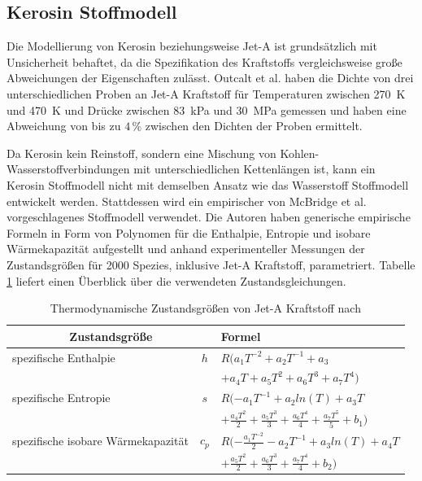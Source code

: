 \subsection{Kerosin Stoffmodell}

Die Modellierung von Kerosin beziehungsweise Jet-A ist grundsätzlich mit Unsicherheit behaftet, da die Spezifikation des Kraftstoffs vergleichsweise große Abweichungen der Eigenschaften zulässt. Outcalt et al. \cite{Outcalt.2009} haben die Dichte von drei unterschiedlichen Proben an Jet-A Kraftstoff für Temperaturen zwischen \SI{270}{\K} und \SI{470}{\K} und Drücke zwischen \SI{83}{\kilo\Pa} und \SI{30}{\mega\Pa} gemessen und haben eine Abweichung von bis zu $4\,\%$ zwischen den Dichten der Proben ermittelt.

Da Kerosin kein Reinstoff, sondern eine Mischung von Kohlen-Wasserstoffverbindungen mit unterschiedlichen Kettenlängen ist, kann ein Kerosin Stoffmodell nicht mit demselben Ansatz wie das Wasserstoff Stoffmodell entwickelt werden. Stattdessen wird ein empirischer von McBridge et al. \cite{McBridge.2002} vorgeschlagenes Stoffmodell verwendet. Die Autoren haben generische empirische Formeln in Form von Polynomen für die Enthalpie, Entropie und isobare Wärmekapazität aufgestellt und anhand experimenteller Messungen der Zustandsgrößen für 2000 Spezies, inklusive Jet-A Kraftstoff, parametriert. Tabelle \ref{Tab:thermodynamic_properties_jeta} liefert einen Überblick über die verwendeten Zustandsgleichungen.

\begin{table}[ht]
    \centering
	\caption{Thermodynamische Zustandsgrößen von Jet-A Kraftstoff nach 
    \cite{McBridge.2002}}
	\begin{tabular} {|l|c|l|} \hline%
		\multicolumn{2}{|c|}{Zustandsgröße}  & Formel\\ \hline\hline%
		  spezifische Enthalpie &$h$ & $R(a_1T^{-2}+a_2T^{-1} +a_3$ \\ 
        & & $+a_4T+a_5T^2+a_6T^3+a_7T^4)$\\ \hline
		  spezifische Entropie& $s$ &  $R(-a_1T^{-1}+a_2ln(T)+a_3T$\\ 
        & & $+\frac{a_4T^2}{2}+\frac{a_5T^3}{3}+\frac{a_6T^4}{4}+\frac{a_7T^5}{5}+b_1)$\\ \hline
        spezifische isobare Wärmekapazität &$c_p$ &  $R(-\frac{a_1T^{-2}}{2}-a_2T^{-1}+a_3ln(T)+ a_4T$\\ 
	    & & $+\frac{a_5T^{2}}{2}+\frac{a_6T^{3}}{3}+\frac{a_7T^{4}}{4}+b_2)$\\ \hline
    \end{tabular}	
    \label{Tab:thermodynamic_properties_jeta}%
\end{table}
\FloatBarrier 

